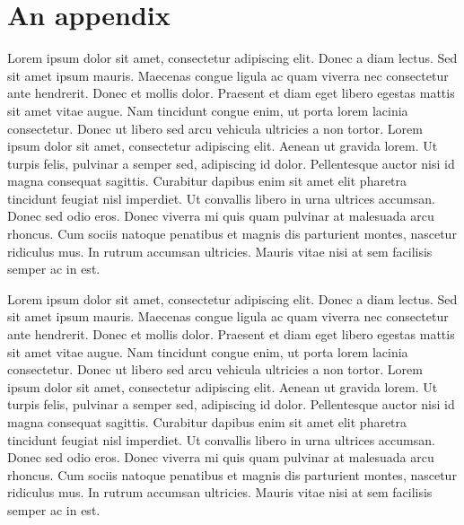 \chapter{An appendix}
\label{ch:appendix}

Lorem ipsum dolor sit amet, consectetur adipiscing elit. Donec a diam lectus.
Sed sit amet ipsum mauris. Maecenas congue ligula ac quam viverra nec
consectetur ante hendrerit. Donec et mollis dolor. Praesent et diam eget libero
egestas mattis sit amet vitae augue. Nam tincidunt congue enim, ut porta lorem
lacinia consectetur. Donec ut libero sed arcu vehicula ultricies a non tortor.
Lorem ipsum dolor sit amet, consectetur adipiscing elit. Aenean ut gravida
lorem. Ut turpis felis, pulvinar a semper sed, adipiscing id dolor. Pellentesque
auctor nisi id magna consequat sagittis. Curabitur dapibus enim sit amet elit
pharetra tincidunt feugiat nisl imperdiet. Ut convallis libero in urna ultrices
accumsan. Donec sed odio eros. Donec viverra mi quis quam pulvinar at malesuada
arcu rhoncus. Cum sociis natoque penatibus et magnis dis parturient montes,
nascetur ridiculus mus. In rutrum accumsan ultricies. Mauris vitae nisi at sem
facilisis semper ac in est.

Lorem ipsum dolor sit amet, consectetur adipiscing elit. Donec a diam lectus.
Sed sit amet ipsum mauris. Maecenas congue ligula ac quam viverra nec
consectetur ante hendrerit. Donec et mollis dolor. Praesent et diam eget libero
egestas mattis sit amet vitae augue. Nam tincidunt congue enim, ut porta lorem
lacinia consectetur. Donec ut libero sed arcu vehicula ultricies a non tortor.
Lorem ipsum dolor sit amet, consectetur adipiscing elit. Aenean ut gravida
lorem. Ut turpis felis, pulvinar a semper sed, adipiscing id dolor. Pellentesque
auctor nisi id magna consequat sagittis. Curabitur dapibus enim sit amet elit
pharetra tincidunt feugiat nisl imperdiet. Ut convallis libero in urna ultrices
accumsan. Donec sed odio eros. Donec viverra mi quis quam pulvinar at malesuada
arcu rhoncus. Cum sociis natoque penatibus et magnis dis parturient montes,
nascetur ridiculus mus. In rutrum accumsan ultricies. Mauris vitae nisi at sem
facilisis semper ac in est.
